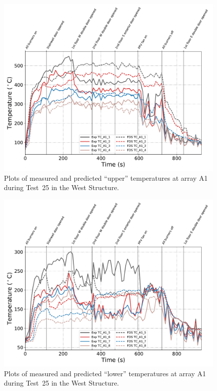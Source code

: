 \begin{figure}[!h]
	\centering
	\includegraphics[width=\columnwidth]{Figures/Plots/Validation/Temperature/Test_25_TC_A1_upper}
	\caption{Plots of measured and predicted ``upper'' temperatures at array A1 during Test~25 in the West Structure.}
	\label{fig:TCA1_upper_data_Test25}
\end{figure}
\begin{figure}[!h]
	\centering
	\includegraphics[width=\columnwidth]{Figures/Plots/Validation/Temperature/Test_25_TC_A1_lower}
	\caption{Plots of measured and predicted ``lower'' temperatures at array A1 during Test~25 in the West Structure.}
	\label{fig:TCA1_lower_data_Test25}
\end{figure}


